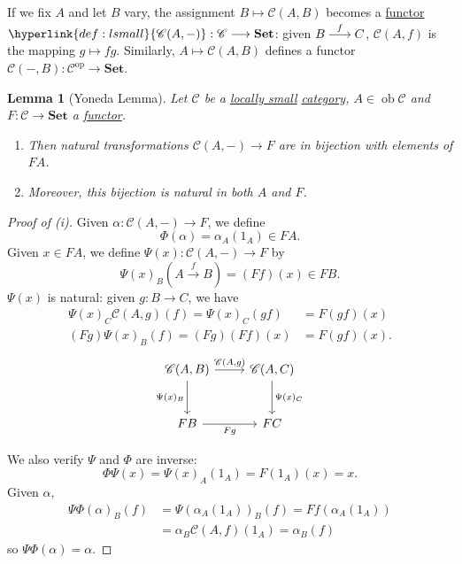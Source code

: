 \documentclass{article}
\DeclareMathOperator{\ob}{ob}
\newenvironment{tikzcdi}{\begin{tikzcd}[cramped, sep=scriptsize]}{\end{tikzcd}}
\let\to\longrightarrow
\let\mapsto\longmapsto
\newtheorem{nlemma}[nthm]{Lemma}
\begin{document}
 If we fix $A$ and let $B$ vary, the assignment $B \mapsto \mathscr{C}(A,B)$ becomes a \hyperlink{def:funct}{functor} $\hyperlink{def:lsmall}{\mathscr{C}(A, -)} : \mathscr{C} \to \mathbf{Set}$: given $\begin{tikzcdi} B \rar{f} & C \end{tikzcdi}$, $\mathscr{C}(A,f)$ is the mapping $g \mapsto fg$.
Similarly, $A \mapsto \mathscr{C}(A,B)$ defines a functor $\mathscr{C}(-, B): \mathscr{C}^\text{op} \to \mathbf{Set}$.
\begin{nlemma}[Yoneda Lemma]\label{lem:2.2}
  Let $\mathscr{C}$ be a \hyperlink{def:lsmall}{locally small} \hyperlink{def:cat}{category}, $A \in \ob \mathscr{C}$ and $F: \mathscr{C} \to \mathbf{Set}$ a \hyperlink{def:funct}{functor}.
  \begin{enumerate}[label=(\roman*)]
    \item Then natural transformations $\mathscr{C}(A, -) \to F$ are in bijection with elements of $FA$.
    \item Moreover, this bijection is natural in both $A$ and $F$.
  \end{enumerate}
\end{nlemma}
\begin{proof}[Proof of (i)]
  Given $\alpha: \mathscr{C}(A,-) \to F$, we define
  \begin{equation*}
    \Phi(\alpha) = \alpha_A(1_A) \in FA.
  \end{equation*}
  Given $x \in FA$, we define $\Psi(x) : \mathscr{C}(A,-) \to F$ by
  \begin{equation*}\Psi(x)_B(A \overset{f}{\to} B) = (Ff)(x) \in FB.\end{equation*}
  $\Psi(x)$ is natural: given $g: B \to C$, we have
  \begin{align*}
    \Psi(x)_C \mathscr{C}(A,g)(f) = \Psi(x)_C(gf) &= F(gf)(x) \\
    (Fg)\Psi(x)_B(f) = (Fg)(Ff)(x) &= F(gf)(x).
  \end{align*}
  \begin{equation*}
    \begin{tikzcd}[row sep=large]
    {\mathscr{C}(A,B)} \arrow[r, "{\mathscr{C}(A,g)}"] \arrow[d, "\Psi(x)_B"'] & {\mathscr{C}(A,C)} \arrow[d, "\Psi(x)_C"] \\
    FB \arrow[r, "Fg"'] & FC
    \end{tikzcd}
  \end{equation*}

  We also verify $\Psi$ and $\Phi$ are inverse:
  \begin{equation*}
    \Phi \Psi(x) = \Psi(x)_A(1_A) = F(1_A)(x) = x.
  \end{equation*}
  Given $\alpha$,
  \begin{align*}
    \Psi\Phi(\alpha)_B(f) &= \Psi(\alpha_A(1_A))_B(f) = Ff(\alpha_A(1_A)) \\
                          &= \alpha_B \mathscr{C}(A,f) (1_A) = \alpha_B(f)
  \end{align*}
  so $\Psi \Phi(\alpha) = \alpha$.
\end{proof}
\end{document}
